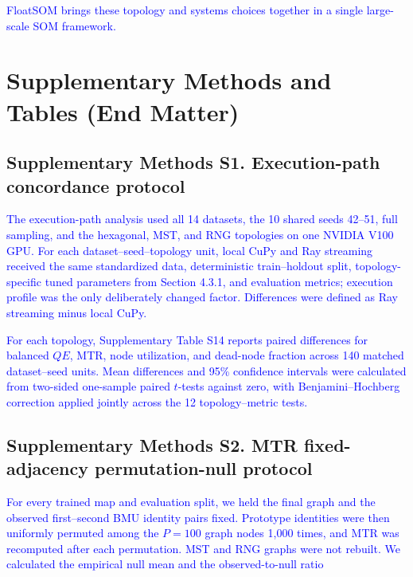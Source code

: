 \documentclass[10pt]{article} %
\newcommand{\TrackedChange}[1]{\textcolor{blue}{#1}}
\begin{document}
\TrackedChange{FloatSOM brings these topology and systems choices together in a single large-scale SOM framework.}




\clearpage

\appendix
{\color{blue}\section{Supplementary Methods and Tables (End Matter)}}

{\color{blue}\subsection{Supplementary Methods S1. Execution-path concordance protocol}}

\TrackedChange{The execution-path analysis used all 14 datasets, the 10 shared seeds 42--51, full sampling, and the hexagonal, MST, and RNG topologies on one NVIDIA V100 GPU.} \TrackedChange{For each dataset--seed--topology unit, local CuPy and Ray streaming received the same standardized data, deterministic train--holdout split, topology-specific tuned parameters from Section 4.3.1, and evaluation metrics; execution profile was the only deliberately changed factor.} \TrackedChange{Differences were defined as Ray streaming minus local CuPy.}

\TrackedChange{For each topology, Supplementary Table S14 reports paired differences for balanced $QE$, MTR, node utilization, and dead-node fraction across 140 matched dataset--seed units.} \TrackedChange{Mean differences and 95\% confidence intervals were calculated from two-sided one-sample paired $t$-tests against zero, with Benjamini--Hochberg correction applied jointly across the 12 topology--metric tests.}

{\color{blue}\subsection{Supplementary Methods S2. MTR fixed-adjacency permutation-null protocol}}

\TrackedChange{For every trained map and evaluation split, we held the final graph and the observed first--second BMU identity pairs fixed.} \TrackedChange{Prototype identities were then uniformly permuted among the $P=100$ graph nodes 1,000 times, and MTR was recomputed after each permutation.} \TrackedChange{MST and RNG graphs were not rebuilt.} \TrackedChange{We calculated the empirical null mean and the observed-to-null ratio}
\end{document}
